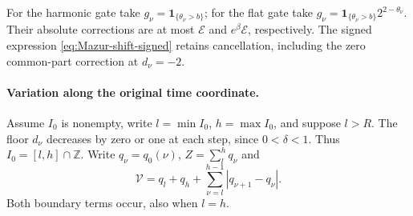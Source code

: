 For the harmonic gate take $g_\nu=\mathbf1_{\{\theta_\nu>b\}}$;
for the flat gate take
$g_\nu=\mathbf1_{\{\theta_\nu>b\}}2^{2-\theta_\nu}$.
Their absolute corrections are at most $\mathcal E$ and
$e^\beta\mathcal E$, respectively. The signed expression
\eqref{eq:Mazur-shift-signed} retains cancellation, including the
zero common-part correction at $d_\nu=-2$.

\paragraph{Variation along the original time coordinate.}
Assume $I_0$ is nonempty, write $l=\min I_0$, $h=\max I_0$,
and suppose $l>R$. The floor $d_\nu$ decreases by zero or one at
each step, since $0<\delta<1$. Thus $I_0=[l,h]\cap\mathbb Z$.
Write $q_\nu=q_0(\nu)$, $Z=\sum_{l}^{h}q_\nu$ and
\[
 \mathcal V=q_l+q_h+\sum_{\nu=l}^{h-1}|q_{\nu+1}-q_\nu|.
\]
Both boundary terms occur, also when $l=h$.

